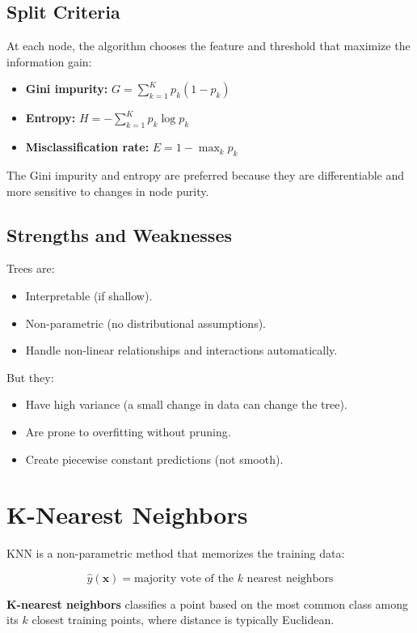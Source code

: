 \subsection{Split Criteria}

At each node, the algorithm chooses the feature and threshold that maximize the information gain:

\begin{itemize}
	\item \textbf{Gini impurity:} $G = \sum_{k=1}^K p_k (1 - p_k)$
	\item \textbf{Entropy:} $H = -\sum_{k=1}^K p_k \log p_k$
	\item \textbf{Misclassification rate:} $E = 1 - \max_k p_k$
\end{itemize}

The Gini impurity and entropy are preferred because they are differentiable and more sensitive to changes in node purity.

\subsection{Strengths and Weaknesses}

Trees are:
\begin{itemize}
	\item Interpretable (if shallow).
	\item Non-parametric (no distributional assumptions).
	\item Handle non-linear relationships and interactions automatically.
\end{itemize}

But they:
\begin{itemize}
	\item Have high variance (a small change in data can change the tree).
	\item Are prone to overfitting without pruning.
	\item Create piecewise constant predictions (not smooth).
\end{itemize}

\section{K-Nearest Neighbors}

KNN is a non-parametric method that memorizes the training data:

\[
	\hat{y}(\mathbf{x}) = \text{majority vote of the } k \text{ nearest neighbors}
\]

\begin{definition}[KNN]
	\textbf{K-nearest neighbors} classifies a point based on the most common class among its $k$ closest training points, where distance is typically Euclidean.
\end{definition}

